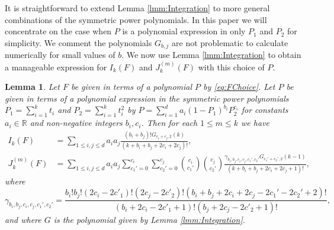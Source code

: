 \documentclass[12pt,a4paper]{amsart}
\theoremstyle{plain}
\newtheorem{lmm}[thrm]{Lemma}
\numberwithin{sblmm}{thrm}
\numberwithin{equation}{section}
\begin{document}
It is straightforward to extend Lemma \ref{lmm:Integration} to more general combinations of the symmetric power polynomials. In this paper we will concentrate on the case when $P$ is a polynomial expression in only $P_1$ and $P_2$ for simplicity. We comment the polynomials $G_{b,j}$ are not problematic to calculate numerically for small values of $b$. We now use Lemma \ref{lmm:Integration} to obtain a manageable expression for $I_k(F)$ and $J_k^{(m)}(F)$ with this choice of $P$.
\begin{lmm}\label{lmm:QuadraticForms}
Let $F$ be given in terms of a polynomial $P$ by \eqref{eq:FChoice}. Let $P$ be given in terms of a polynomial expression in the symmetric power polynomials $P_1=\sum_{i=1}^k t_i$ and $P_2=\sum_{i=1}^kt_i^2$ by $P=\sum_{i=1}^da_i(1-P_1)^{b_i}P_2^{c_i}$ for constants $a_i\in \mathbb{R}$ and non-negative integers $b_i,c_i$. Then for each $1\le m\le k$ we have
\begin{align*}
I_k(F)&=\sum_{1\le i,j\le d}a_ia_j\frac{(b_i+b_j)!G_{c_i+c_j,2}(k)}{(k+b_i+b_j+2c_i+2c_j)!},\\
J^{(m)}_k(F)&=\sum_{1\le i,j\le d}a_ia_j\sum_{c_1'=0}^{c_i}\sum_{c_2'=0}^{c_j}\binom{c_i}{c_1'}\binom{c_j}{c_2'}\frac{\gamma_{b_i,b_j,c_i,c_j,c_1',c_2'}G_{c_1'+c_2',2}(k-1)}{(k+b_i+b_j+2c_i+2c_j+1)!},
\end{align*}
where
\[
\gamma_{b_i,b_j,c_i,c_j,c_1',c_2'}=\frac{b_i!b_j!(2c_i-2c'_1)!(2c_j-2c'_2)!(b_i+b_j+2c_i+2c_j-2c_1'-2c_2'+2)!}{(b_i+2c_i-2c'_1+1)!(b_j+2c_j-2c'_2+1)!
},
\]
and where $G$ is the polynomial given by Lemma \ref{lmm:Integration}.
\end{lmm}
\end{document}
